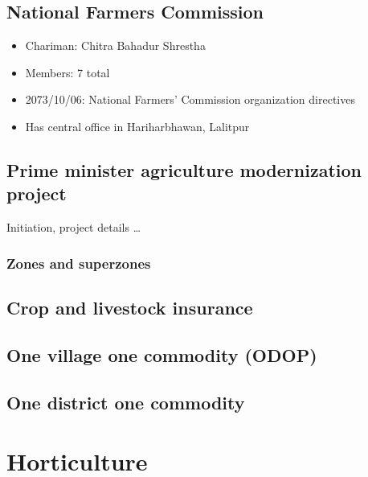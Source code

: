 \documentclass[
  openany]{book}
\providecommand{\tightlist}{%
  \setlength{\itemsep}{0pt}\setlength{\parskip}{0pt}}
\begin{document}
\hypertarget{national-farmers-commission}{%
\section{National Farmers Commission}\label{national-farmers-commission}}

\begin{itemize}
\tightlist
\item
  Chariman: Chitra Bahadur Shrestha
\item
  Members: 7 total
\item
  2073/10/06: National Farmers' Commission organization directives
\item
  Has central office in Hariharbhawan, Lalitpur
\end{itemize}

\hypertarget{prime-minister-agriculture-modernization-project}{%
\section{Prime minister agriculture modernization project}\label{prime-minister-agriculture-modernization-project}}

Initiation, project details \ldots{}

\hypertarget{zones-and-superzones}{%
\subsection{Zones and superzones}\label{zones-and-superzones}}

\hypertarget{crop-and-livestock-insurance}{%
\section{Crop and livestock insurance}\label{crop-and-livestock-insurance}}

\hypertarget{one-village-one-commodity-odop}{%
\section{One village one commodity (ODOP)}\label{one-village-one-commodity-odop}}

\hypertarget{one-district-one-commodity}{%
\section{One district one commodity}\label{one-district-one-commodity}}

\hypertarget{horticulture}{%
\chapter{Horticulture}\label{horticulture}}
\end{document}
